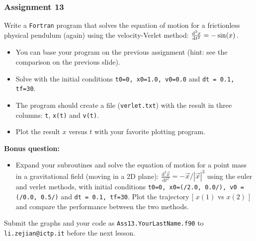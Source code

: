 \documentclass[11pt,aspectratio=169,handout]{beamer}
\begin{document}
\begin{frame}
\frametitle{Assignment 13}
Write a \texttt{Fortran} program that solves the equation of motion for a frictionless physical pendulum (again) using the velocity-Verlet method: $\frac{{\rm {d}}^2 x}{{\rm {d}} t^2} = -\sin(x)\,.$

\pause
\begin{itemize}
	\item You can base your program on the previous assignment (hint: see the comparison on the previous slide).
	\item Solve with the initial conditions \texttt{t0=0, x0=1.0, v0=0.0} and \texttt{dt = 0.1, tf=30}.
	\item The program should create a file (\texttt{verlet.txt}) with the result in three columns: \texttt{t}, \texttt{x(t)} and \texttt{v(t)}.\pause
	\item Plot the result $x$ versus $t$ with your favorite plotting program.\pause
\end{itemize}
\textbf{Bonus question:}
\begin{itemize}
	\item Expand your subroutines and solve the equation of motion for a point mass in a gravitational field (moving in a 2D plane): $\frac{\mathrm{d}^2 \vec{x}}{\mathrm{d} t^2} = -\vec{x}/|\vec{x}|^3$ using the euler and verlet methods, with initial conditions \texttt{t0=0, x0=(/2.0, 0.0/),  v0 = (/0.0, 0.5/)} and \texttt{dt = 0.1, tf=30}. Plot the trajectory [ $x(1)$ vs $x(2)$ ] and compare the performance between the two methods.
\end{itemize}
Submit the graphs and your code as \texttt{Ass13.YourLastName.f90} to \texttt{li.zejian@ictp.it} before the next lesson.
\end{frame}
\end{document}
